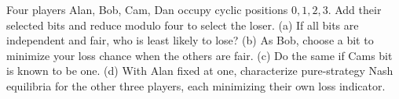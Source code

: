 Four players Alan, Bob, Cam, Dan occupy cyclic positions $0,1,2,3$. Add their selected bits and reduce modulo four to select the loser. (a) If all bits are independent and fair, who is least likely to lose? (b) As Bob, choose a bit to minimize your loss chance when the others are fair. (c) Do the same if Cam\textquotesingle s bit is known to be one. (d) With Alan fixed at one, characterize pure-strategy Nash equilibria for the other three players, each minimizing their own loss indicator.
